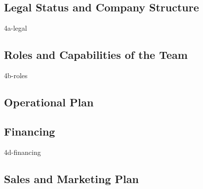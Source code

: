 \subsection*{Legal Status and Company Structure}\label{subsec:legalStatusAndCompanyStructure}
{4a-legal}

\subsection*{Roles and Capabilities of the Team}\label{subsec:rolesAndCapabilitiesOfTheTeam}
{4b-roles}

\subsection*{Operational Plan}

\subsection*{Financing}\label{subsec:financing}
{4d-financing}

\subsection*{Sales and Marketing Plan}
